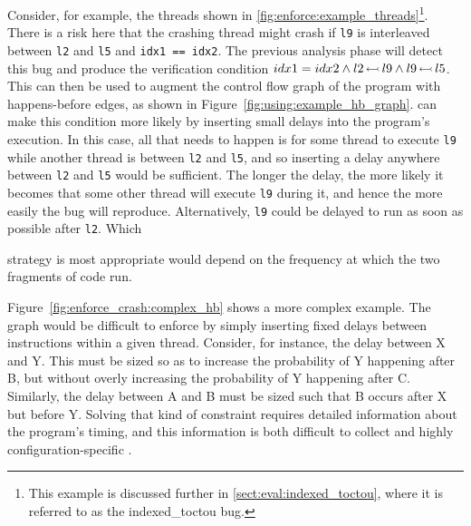 Consider, for example, the threads shown in
\autoref{fig:enforce:example_threads}\footnote{This example is
  discussed further in \autoref{sect:eval:indexed_toctou}, where it is
  referred to as the indexed\_toctou bug.}.  There is a risk here that
the crashing thread might crash if \verb|l9| is interleaved between
\verb|l2| and \verb|l5| and \verb|idx1 == idx2|.  The previous
analysis phase will detect this bug and produce the verification
condition $idx1 = idx2 \wedge l2\,{\leftarrowtail}\,l9 \wedge
l9\,{\leftarrowtail}\,l5$.  This can then be used to augment the control
flow graph of the program with happens-before edges, as shown in
Figure~\ref{fig:using:example_hb_graph}.  {\Technique} can make this
condition more likely by inserting small delays into the program's
execution.  In this case, all that needs to happen is for some thread
to execute \texttt{l9} while another thread is between \texttt{l2} and
\texttt{l5}, and so inserting a delay anywhere between \texttt{l2} and
\texttt{l5} would be sufficient.  The longer the delay, the more
likely it becomes that some other thread will execute \texttt{l9}
during it, and hence the more easily the bug will reproduce.
Alternatively, \texttt{l9} could be delayed to run as soon as possible
after \texttt{l2}.  Which
strategy is most appropriate would depend on the frequency at which
the two fragments of code run.

Figure~\ref{fig:enforce_crash:complex_hb} shows a more complex
example.  The graph would be difficult to enforce by simply inserting
fixed delays between instructions within a given thread.  Consider,
for instance, the delay between X and Y.  This must be sized so as to
increase the probability of Y happening after B, but without overly
increasing the probability of Y happening
after C.  Similarly, the delay between A and B must be sized such that
B occurs after X but before Y.  Solving that kind of constraint
requires detailed information about the program's timing, and this
information is both difficult to collect and highly
configuration-specific .


